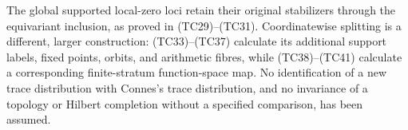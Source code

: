 \documentclass[
  10pt,
]{article}
\begin{document}
The global supported local-zero loci retain their original stabilizers
through the equivariant inclusion, as proved in (TC29)--(TC31).
Coordinatewise splitting is a different, larger construction:
(TC33)--(TC37) calculate its additional support labels, fixed points,
orbits, and arithmetic fibres, while (TC38)--(TC41) calculate a
corresponding finite-stratum function-space map. No identification of a
new trace distribution with Connes's trace distribution, and no
invariance of a topology or Hilbert completion without a specified
comparison, has been assumed.
\end{document}
